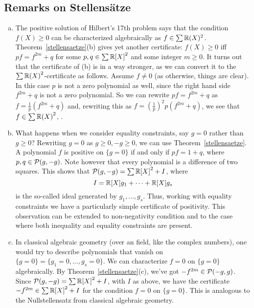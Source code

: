 \subsection{Remarks on Stellensätze}

	\begin{enumerate}[(a)]
		\item The positive solution of Hilbert's 17th problem says that the condition $f(X) \ge 0$ can be characterized algebraically as $f \in \sum \mathbb{R}(X)^2$. Theorem~\ref{stellensaetze}(b) gives yet another certificate: $f(X) \ge 0$ iff $p f = f^{2m} + q$ for some $p, q \in \sum {\mathbb{R}[X]}^2$ and some integer $m \ge 0$. It turns out that the certificate of (b) is in a way stronger, as we can convert it to the $\sum {\mathbb{R}(X)}^2$-certificate as follows. Assume $f \ne 0$ (as otherwise, things are clear). In this case $p$ is not a zero polynomial as well, since the right hand side $f^{2m} + q$ is not a zero polynomial. So we can rewrite $p f = f^{2m}+ q$ as $f = \frac{1}{p} (f^{2m} + q)$ and, rewriting this as $f = (\frac{1}{p})^2 p ( f^{2m} + q)$, we see that $f \in \sum {\mathbb{R}(X)}^2$, .
		\item What happens when we consider equality constraints, say $g=0$ rather than $g \ge 0$? Rewriting $g=0$ as $g \ge 0, -g \ge 0$, we can use Theorem~\ref{stellensaetze}. A polynomial $f$ is positive on $\{g=0\}$ if and only if $p f = 1+q$, where $p,q \in \mathcal{P}(g,-g)$. Note however that every polynomial is a difference of two squares. This shows that $\mathcal{P}(g,-g) = \sum {\mathbb{R}[X]}^2 + I$, where
		\[
			I = \mathbb{R}[X] g_1 + \cdots + \mathbb{R}[X] g_s
		\]
		is the so-called ideal generated by $g_1,\ldots,g_s$. Thus, working with equality constraints we have a particularly simple certificate of positivity. This observation can be extended to non-negativity condition and to the case where both inequality and equality constraints are present. 
		\item In classical algebraic geometry (over an  field, like the complex numbers), one would try to describe polynomials that vanish on $\{g=0\} = \{g_1=0,\ldots,g_s=0\}$. We can characterize  $f=0$ on $\{g=0\}$ algebraically. By Theorem~\ref{stellensaetze}(c), we've got $-f^{2m} \in \mathcal{P}(-g,g)$. Since $\mathcal{P}(g,-g) = \sum {\mathbb{R}[X]}^2 +I$, with $I$ as above, we have the certificate $-f^{2m} \in \sum {\mathbb{R}[X]}^2 +I$ for the condition $f = 0$ on $\{g=0\}$. This is analogous to the Nullstellensatz from classical algebraic geometry. 


\end{enumerate}
